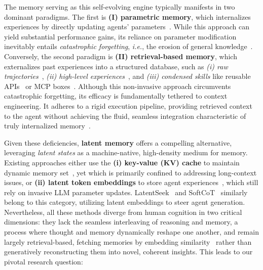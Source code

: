 \documentclass[]{fairmeta}
\begin{document}
The memory serving as this self-evolving engine typically manifests in two dominant paradigms. The first is \textbf{(I) parametric memory}, which internalizes experiences by directly updating agents' parameters~\citep{yao2024retroformerretrospectivelargelanguage,zeng2023agenttuningenablinggeneralizedagent,chen2024agentflandesigningdatamethods,chen2025atlasagenttuninglearning}. While this approach can yield substantial performance gains, its reliance on parameter modification inevitably entails \textit{catastrophic forgetting}, \textit{i.e.}, {the erosion of general knowledge}~\citep{dou2024loramoealleviateworldknowledge}.
Conversely, the second paradigm is \textbf{(II) retrieval-based memory}, which externalizes past experiences into a structured database, such as \textit{(i) raw trajectories}~\citep{luo2025agentauditorhumanlevelsafetysecurity,zhang2025gmemorytracinghierarchicalmemory,zhao2024expelllmagentsexperiential}, \textit{(ii) high-level experiences}~\citep{zhao2024expelllmagentsexperiential,fang2025memp,wang2024agentworkflowmemory}, and \textit{(iii) condensed skills} like reusable APIs~\citep{zheng2025skillweaverwebagentsselfimprove} or MCP boxes~\citep{qiu2025alitageneralistagentenabling,qiu2025agentdistilltrainingfreeagentdistillation}. Although this non-invasive approach circumvents catastrophic forgetting, its efficacy is fundamentally tethered to context engineering. It adheres to a rigid execution pipeline, providing retrieved context to the agent without achieving the fluid, seamless integration characteristic of truly internalized memory~\citep{su2025parametricretrievalaugmentedgeneration}.



Given these deficiencies, \textbf{latent memory} offers a compelling alternative, leveraging \textit{latent states} as a machine-native, high-density medium for memory. Existing approaches either use the \textbf{(i) key-value (KV) cache} to maintain dynamic memory set~\citep{gim2024promptcache,jin2024ragcache,memory3Hongkang_Yang_2024}, yet which is primarily confined to addressing long-context issues, or \textbf{(ii) latent token embeddings} to store agent experiences~\citep{wang2024memoryllm,wang2025mextendingmemoryllmscalable}, which still rely on invasive LLM parameter updates. LatentSeek~\citep{li2025seekdarkreasoningtesttime} and SoftCoT~\citep{xu2025softcotsoftchainofthoughtefficient,xu2025softcottesttimescalingsoft} similarly belong to this category, utilizing latent embeddings to steer agent generation. Nevertheless, all these methods diverge from human cognition in two critical dimensions: they lack the seamless interleaving of reasoning and memory, a process where thought and memory dynamically reshape one another, and remain largely retrieval-based, fetching memories by embedding similarity~\citep{wang2024memoryllm} rather than generatively reconstructing them into novel, coherent insights. This leads to our pivotal research question:
\end{document}
